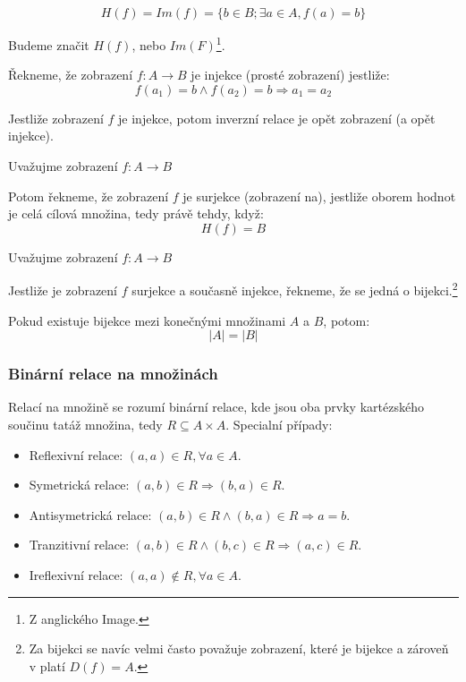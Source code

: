 \begin{definition}
	$$H(f) = Im(f) = \{b \in B; \exists a \in A, f(a) = b\}$$

	Budeme značit $H(f)$, nebo $Im(F)$\footnote{Z anglického Image.}.
\end{definition}

\begin{definition}
	Řekneme, že zobrazení $f: A \rightarrow B$ je injekce (prosté zobrazení)
	jestliže: $$f(a_1) = b \wedge f(a_2) = b \Rightarrow a_1 = a_2$$

	Jestliže zobrazení $f$ je injekce,
	potom inverzní relace je opět zobrazení (a opět injekce).
\end{definition}

\begin{definition}[Surjekce]
	Uvažujme zobrazení $f: A \rightarrow B$

	Potom řekneme, že zobrazení $f$ je surjekce (zobrazení na),
	jestliže oborem hodnot je celá cílová množina, tedy právě tehdy, když:
	$$H(f) = B$$
\end{definition}

\begin{definition}[Bijekce]
	Uvažujme zobrazení $f: A \rightarrow B$

	Jestliže je zobrazení $f$ surjekce a současně injekce,
	řekneme, že se jedná o bijekci.\footnote{Za bijekci se navíc velmi
	často považuje zobrazení, které je bijekce a zároveň v platí $D(f) = A$.}

	Pokud existuje bijekce mezi konečnými množinami $A$ a $B$, potom:
	$$|A| = |B|$$
\end{definition}

\subsubsection*{Binární relace na množinách}
Relací na množině se rozumí binární relace, kde jsou oba prvky kartézského součinu tatáž
množina, tedy $R \subseteq A \times A$.
Specialní případy:
\begin{itemize}
	\item Reflexivní relace: $(a, a) \in R, \forall a \in A$.
	\item Symetrická relace: $(a, b) \in R \Rightarrow (b, a) \in R$.
	\item Antisymetrická relace: $(a, b) \in R \wedge (b, a) \in R \Rightarrow a = b$.
	\item Tranzitivní relace: $(a, b) \in R \wedge (b, c) \in R \Rightarrow (a, c) \in R$.
	\item Ireflexivní relace: $(a, a) \notin R, \forall a \in A$.
\end{itemize}

